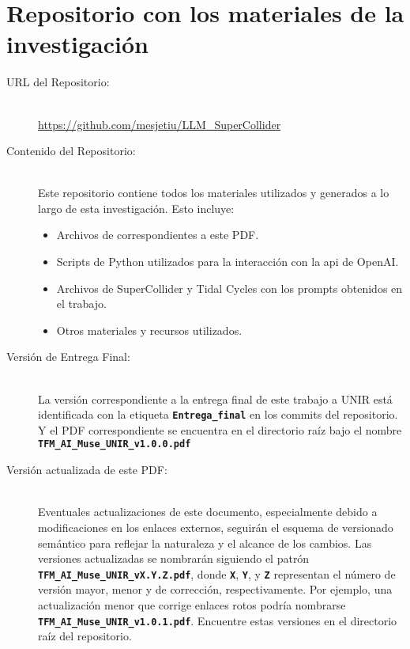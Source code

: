 \chapter{Repositorio con los materiales de la investigación}
\label{anexo:repositorio}



\begin{center}
\end{center}

\begin{description}
    \item[URL del Repositorio:] \hfill \\
    \url{https://github.com/mesjetiu/LLM_SuperCollider}
    
    \item[Contenido del Repositorio:] \hfill \\
    Este repositorio contiene todos los materiales utilizados y generados a lo largo de esta investigación. Esto incluye:
    \begin{itemize}
        \item Archivos de  correspondientes a este PDF.
        \item Scripts de Python utilizados para la interacción con la \gls{api} de OpenAI.
        \item Archivos de SuperCollider y Tidal Cycles con los {prompts} obtenidos en el trabajo.
        \item Otros materiales y recursos utilizados.
    \end{itemize}
    
    \item[Versión de Entrega Final:] \hfill \\
    La versión correspondiente a la entrega final de este trabajo a UNIR está identificada con la etiqueta \textbf{\texttt{Entrega\_final}} en los commits del repositorio. Y el PDF correspondiente se encuentra en el directorio raíz bajo el nombre \textbf{\texttt{TFM\_AI\_Muse\_UNIR\_v1.0.0.pdf}}

	\item[Versión actualizada de este PDF:] \hfill \\
    Eventuales actualizaciones de este documento, especialmente debido a modificaciones en los enlaces externos, seguirán el esquema de versionado semántico para reflejar la naturaleza y el alcance de los cambios. Las versiones actualizadas se nombrarán siguiendo el patrón \textbf{\texttt{TFM\_AI\_Muse\_UNIR\_vX.Y.Z.pdf}}, donde \textbf{\texttt{X}}, \textbf{\texttt{Y}}, y \textbf{\texttt{Z}} representan el número de versión mayor, menor y de corrección, respectivamente. Por ejemplo, una actualización menor que corrige enlaces rotos podría nombrarse \textbf{\texttt{TFM\_AI\_Muse\_UNIR\_v1.0.1.pdf}}. Encuentre estas versiones en el directorio raíz del repositorio.


\end{description}



